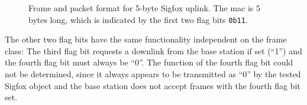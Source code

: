 \begin{figure}[h]
{}
	\caption{Frame and packet format for 5-byte Sigfox uplink. The \gls{mac} is 5 bytes long, which is indicated by the first two flag bits \texttt{0b11}.}
	\label{fig:uplinkframe_5byte}
\end{figure}

The other two flag bits have the same functionality independent on the frame class: The third flag bit requests a downlink from the base station if set (``1'') and the fourth flag bit must always be ``0''.
The function of the fourth flag bit could not be determined, since it always appears to be transmitted as ``0'' by the tested Sigfox object and the base station does not accept frames with the fourth flag bit set.

